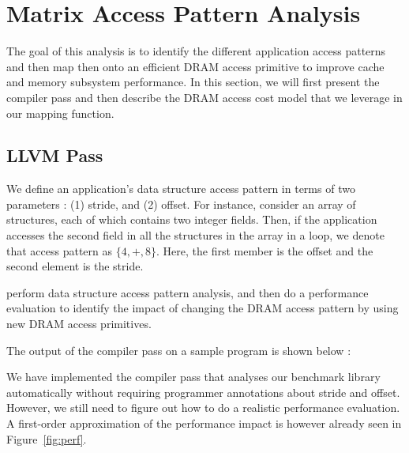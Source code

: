 \documentclass[letterpaper]{article}
\begin{document}
\section{Matrix Access Pattern Analysis}

The goal of this analysis is to identify the different application access
patterns and then map then onto an efficient DRAM access primitive to improve
cache and memory subsystem performance. In this section, we will first present
the compiler pass and then describe the DRAM access cost model that we leverage
in our mapping function.

\subsection{LLVM Pass}

We define an application's data structure access pattern in terms of two
parameters : (1) stride, and (2) offset. For instance, consider an array
of structures, each of which contains two integer fields. Then, if the
application accesses the second field in all the structures in the array
in a loop, we denote that access pattern as $\{4,+,8\}$. Here, the first
member is the offset and the second element is the stride.

 perform data structure access pattern
analysis, and then do a performance evaluation to identify the impact of changing the DRAM
access pattern by using new DRAM access primitives.

The output of the compiler pass on a sample program is shown below :

We have implemented the compiler pass that analyses our benchmark library automatically without requiring
programmer annotations about stride and offset. However, we still need to figure out how to do
a realistic performance evaluation. A first-order approximation of the performance impact is
however already seen in Figure~\ref{fig:perf}.
\end{document}
